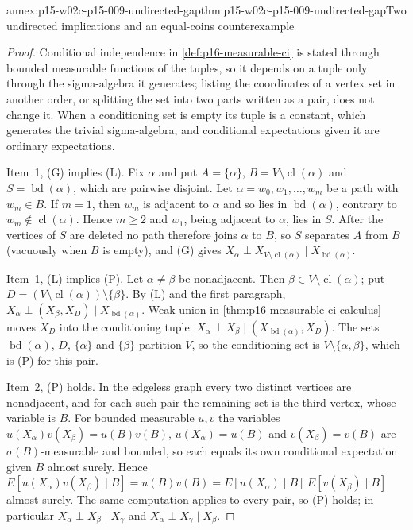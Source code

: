\begin{annexitem}{annex:p15-w02c-p15-009-undirected-gap}{thm:p15-w02c-p15-009-undirected-gap}{Two undirected implications and an equal-coins counterexample}
\begin{proof}
Conditional independence in \cref{def:p16-measurable-ci} is stated
through bounded measurable functions of the tuples, so it depends on a
tuple only through the sigma-algebra it generates; listing the
coordinates of a vertex set in another order, or splitting the set into
two parts written as a pair, does not change it. When a conditioning
set is empty its tuple is a constant, which generates the trivial
sigma-algebra, and conditional expectations given it are ordinary
expectations.

Item~1, (G) implies (L). Fix \(\alpha\) and put \(A=\{\alpha\}\),
\(B=V\setminus\operatorname{cl}(\alpha)\) and
\(S=\operatorname{bd}(\alpha)\), which are pairwise disjoint. Let
\(\alpha=w_0,w_1,\ldots,w_m\) be a path with \(w_m\in B\). If \(m=1\),
then \(w_m\) is adjacent to \(\alpha\) and so lies in
\(\operatorname{bd}(\alpha)\), contrary to \(w_m\notin\operatorname{cl}(\alpha)\).
Hence \(m\geq2\) and \(w_1\), being adjacent to \(\alpha\), lies in
\(S\). After the vertices of \(S\) are deleted no path therefore joins
\(\alpha\) to \(B\), so \(S\) separates \(A\) from \(B\) (vacuously when
\(B\) is empty), and (G) gives
\(X_\alpha\perp X_{V\setminus\operatorname{cl}(\alpha)}
\mid X_{\operatorname{bd}(\alpha)}\).

Item~1, (L) implies (P). Let \(\alpha\ne\beta\) be nonadjacent. Then
\(\beta\in V\setminus\operatorname{cl}(\alpha)\); put
\(D=(V\setminus\operatorname{cl}(\alpha))\setminus\{\beta\}\). By (L)
and the first paragraph,
\(X_\alpha\perp(X_\beta,X_D)\mid X_{\operatorname{bd}(\alpha)}\). Weak
union in \cref{thm:p16-measurable-ci-calculus} moves \(X_D\) into the
conditioning tuple:
\(X_\alpha\perp X_\beta\mid(X_{\operatorname{bd}(\alpha)},X_D)\). The
sets \(\operatorname{bd}(\alpha)\), \(D\), \(\{\alpha\}\) and
\(\{\beta\}\) partition \(V\), so the conditioning set is
\(V\setminus\{\alpha,\beta\}\), which is (P) for this pair.

Item~2, (P) holds. In the edgeless graph every two distinct vertices are
nonadjacent, and for each such pair the remaining set is the third
vertex, whose variable is \(B\). For bounded measurable \(u,v\) the
variables \(u(X_\alpha)v(X_\beta)=u(B)v(B)\), \(u(X_\alpha)=u(B)\) and
\(v(X_\beta)=v(B)\) are \(\sigma(B)\)-measurable and bounded, so each
equals its own conditional expectation given \(B\) almost surely. Hence
\(E[u(X_\alpha)v(X_\beta)\mid B]=u(B)v(B)
=E[u(X_\alpha)\mid B]\,E[v(X_\beta)\mid B]\) almost surely. The same
computation applies to every pair, so (P) holds; in particular
\(X_\alpha\perp X_\beta\mid X_\gamma\) and
\(X_\alpha\perp X_\gamma\mid X_\beta\).


\end{proof}
\end{annexitem}
